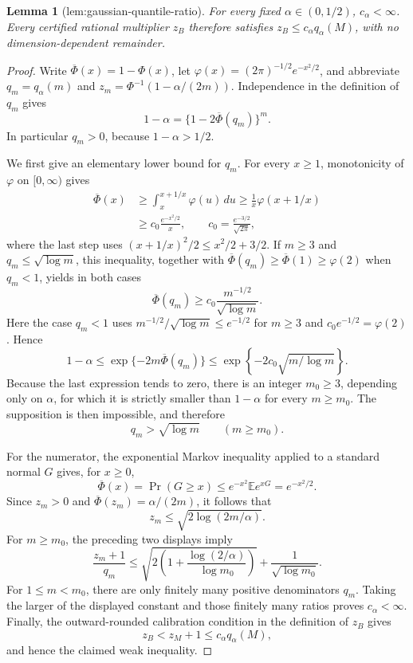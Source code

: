 \documentclass{article}
\newtheorem{lemma}{Lemma}
\begin{document}
\begin{lemma}[lem:gaussian-quantile-ratio]\label{lem:gaussian-quantile-ratio}
For every fixed \(\alpha\in(0,1/2)\), \(c_\alpha<\infty\). Every certified rational multiplier \(z_B\) therefore satisfies \(z_B\le c_\alpha q_\alpha(M)\), with no dimension-dependent remainder.
\end{lemma}
\begin{proof}
Write \(\overline\Phi(x)=1-\Phi(x)\), let \(\varphi(x)=(2\pi)^{-1/2}e^{-x^2/2}\), and abbreviate \(q_m=q_\alpha(m)\) and \(z_m=\Phi^{-1}(1-\alpha/(2m))\).  Independence in the definition of \(q_m\) gives
\[
1-\alpha=\{1-2\overline\Phi(q_m)\}^{m}.
\]
In particular \(q_m>0\), because \(1-\alpha>1/2\).

We first give an elementary lower bound for \(q_m\).  For every \(x\geq1\), monotonicity of \(\varphi\) on \([0,\infty)\) gives
\[
\begin{aligned}
\overline\Phi(x)
&\geq\int_x^{x+1/x}\varphi(u)\,du
\geq\frac1x\varphi(x+1/x)\\
&\geq c_0\frac{e^{-x^2/2}}x,
\qquad c_0=\frac{e^{-3/2}}{\sqrt{2\pi}},
\end{aligned}
\]
where the last step uses \((x+1/x)^2/2\leq x^2/2+3/2\).  If \(m\geq3\) and \(q_m\leq\sqrt{\log m}\), this inequality, together with \(\overline\Phi(q_m)\geq\overline\Phi(1)\geq\varphi(2)\) when \(q_m<1\), yields in both cases
\[
\overline\Phi(q_m)\geq c_0\frac{m^{-1/2}}{\sqrt{\log m}}.
\]
Here the case \(q_m<1\) uses \(m^{-1/2}/\sqrt{\log m}\leq e^{-1/2}\) for \(m\geq3\) and \(c_0e^{-1/2}=\varphi(2)\).  Hence
\[
1-\alpha
\leq\exp\{-2m\overline\Phi(q_m)\}
\leq\exp\!\left\{-2c_0\sqrt{m/\log m}\right\}.
\]
Because the last expression tends to zero, there is an integer \(m_0\geq3\), depending only on \(\alpha\), for which it is strictly smaller than \(1-\alpha\) for every \(m\geq m_0\).  The supposition is then impossible, and therefore
\[
q_m>\sqrt{\log m}\qquad(m\geq m_0).
\]

For the numerator, the exponential Markov inequality applied to a standard normal \(G\) gives, for \(x\geq0\),
\[
\overline\Phi(x)=\Pr(G\geq x)
\leq e^{-x^2}\mathbb E e^{xG}=e^{-x^2/2}.
\]
Since \(z_m>0\) and \(\overline\Phi(z_m)=\alpha/(2m)\), it follows that
\[
z_m\leq\sqrt{2\log(2m/\alpha)}.
\]
For \(m\geq m_0\), the preceding two displays imply
\[
\frac{z_m+1}{q_m}
\leq
\sqrt{2\left(1+\frac{\log(2/\alpha)}{\log m_0}\right)}
+\frac1{\sqrt{\log m_0}}.
\]
For \(1\leq m<m_0\), there are only finitely many positive denominators \(q_m\).  Taking the larger of the displayed constant and those finitely many ratios proves \(c_\alpha<\infty\).  Finally, the outward-rounded calibration condition in the definition of \(z_B\) gives
\[
z_B<z_M+1\leq c_\alpha q_\alpha(M),
\]
and hence the claimed weak inequality.
\end{proof}
\end{document}
